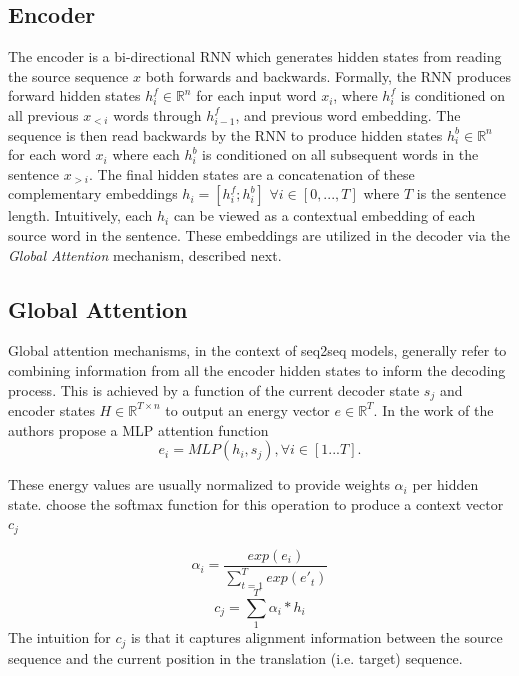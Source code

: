 \subsection{Encoder}
The encoder is a bi-directional \ac{RNN} which generates hidden states from reading the source sequence $x$ both forwards and backwards. Formally, the \ac{RNN} produces forward hidden states $h^{f}_{i} \in \mathbb{R}^{n}$ for each input word $x_{i}$, where $h^{f}_{i}$ is conditioned on all previous $x_{<i}$ words through $h_{i-1}^{f}$, and previous word embedding. The sequence is then read backwards by the \ac{RNN} to produce hidden states $h^{b}_{i} \in \mathbb{R}^{n}$ for each word $x_{i}$ where each $h^{b}_{i}$ is conditioned on all subsequent words in the sentence $x_{>i}$. The final hidden states are a concatenation of these complementary embeddings $h_{i}  = [h^{f}_{i} ; h^{b}_{i}]$ $ \forall i \in [0,...,T]$ where $T$ is the sentence length. Intuitively, each $h_{i}$ can be viewed as a contextual embedding of each source word in the sentence. These embeddings are utilized in the decoder via the \textit{Global Attention} mechanism, described next. %

\subsection{Global Attention}

Global attention mechanisms, in the context of \ac{seq2seq} models, generally refer to combining information from all the encoder hidden states to inform the decoding process. This is achieved by a function of the current decoder state $s_{j}$ and encoder states $H \in \mathbb{R}^{T \times n}$ to output an energy vector $e \in \mathbb{R}^{T}$. In the work of \citet{bahdanau2014NMTBYJoint} the authors propose a \ac{MLP} attention function
\begin{equation}
e_{i} = MLP(h_{i}, s_{j}), \forall i \in [1...T].
\end{equation}


These energy values are usually normalized to provide weights $\alpha_{i}$ per hidden state. \citet{bahdanau2014NMTBYJoint} choose the softmax function for this operation to produce a context vector $c_{j}$

\begin{equation}
	\alpha_{i} = \frac{exp(e_{i})}{\sum_{t=1}^{T} exp(e'_{t})}
\end{equation}
\begin{equation}
c_{j} = \sum_{1}^{T} \alpha_{i} * h_{i}
\end{equation}
The intuition for $c_{j}$ is that it captures alignment information between the source sequence and the current position in the translation (i.e. target) sequence. %

